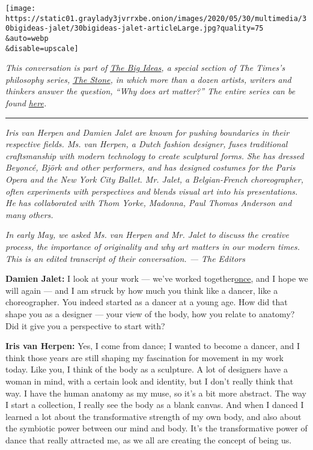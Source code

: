 \texttt{[image: https://static01.graylady3jvrrxbe.onion/images/2020/05/30/multimedia/30bigideas-jalet/30bigideas-jalet-articleLarge.jpg?quality=75\\\&auto=webp\\\&disable=upscale]}

\emph{This conversation is part of}
\href{https://www.nytimes3xbfgragh.onion/spotlight/the-big-ideas}{\emph{The
Big Ideas}}\emph{, a special section of The Times's philosophy series,}
\href{https://www.nytimes3xbfgragh.onion/column/the-stone?action=click\&module=RelatedLinks\&pgtype=Article}{\emph{The
Stone}}\emph{, in which more than a dozen artists, writers and thinkers
answer the question, ``Why does art matter?'' The entire series can be
found}
\href{https://www.nytimes3xbfgragh.onion/spotlight/the-big-ideas}{\emph{here}}\emph{.}

\begin{center}\rule{0.5\linewidth}{\linethickness}\end{center}

\emph{Iris van Herpen and Damien Jalet are known for pushing boundaries
in their respective fields. Ms. van Herpen, a Dutch fashion designer,
fuses traditional craftsmanship with modern technology to create
sculptural forms. She has dressed Beyoncé, Björk and other performers,
and has designed costumes for the Paris Opera and the New York City
Ballet. Mr. Jalet, a Belgian-French choreographer, often experiments
with perspectives and blends visual art into his presentations. He has
collaborated with Thom Yorke, Madonna, Paul Thomas Anderson and many
others.}

\emph{In early May, we asked Ms. van Herpen and Mr. Jalet to discuss the
creative process, the importance of originality and why art matters in
our modern times. This is an edited transcript of their conversation.
--- The Editors}

\textbf{Damien Jalet:} I look at your work --- we've worked
together\href{https://www.operaballet.be/nl/programma/2017-2018/pelleas-et-melisande}{once},
and I hope we will again --- and I am struck by how much you think like
a dancer, like a choreographer. You indeed started as a dancer at a
young age. How did that shape you as a designer --- your view of the
body, how you relate to anatomy? Did it give you a perspective to start
with?

\textbf{Iris van Herpen:} Yes, I come from dance; I wanted to become a
dancer, and I think those years are still shaping my fascination for
movement in my work today. Like you, I think of the body as a sculpture.
A lot of designers have a woman in mind, with a certain look and
identity, but I don't really think that way. I have the human anatomy as
my muse, so it's a bit more abstract. The way I start a collection, I
really see the body as a blank canvas. And when I danced I learned a lot
about the transformative strength of my own body, and also about the
symbiotic power between our mind and body. It's the transformative power
of dance that really attracted me, as we all are creating the concept of
being us.

